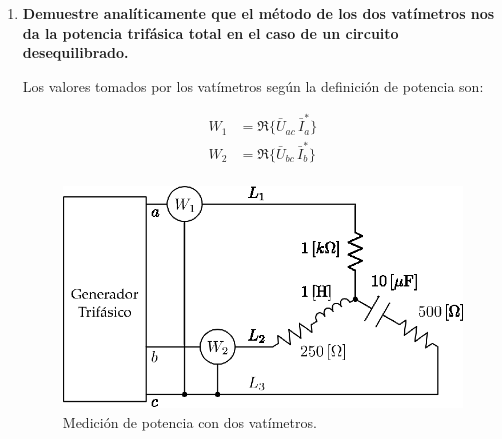 \documentclass[letter,11pt]{article}
\begin{document}
\begin{enumerate}
\item \textbf{Demuestre analíticamente que el método de los dos vatímetros nos
da la potencia trifásica total en el caso de un circuito desequilibrado.}

Los valores tomados por los vatímetros según la definición de potencia son:

\begin{equation*}
    \begin{split}
        W_1 &= \Re\{\bar{U}_{ac}\,\bar{I}_{a}^*\}\\
        W_2 &= \Re\{\bar{U}_{bc}\,\bar{I}_{b}^*\}\\
    \end{split}
\end{equation*}

\begin{figure}[!h]
\centering
\includegraphics[scale=0.95]{figura2.eps}
\caption{Medición de potencia con dos vatímetros.}
\label{circuito2}
\end{figure}


\end{enumerate}
\end{document}
